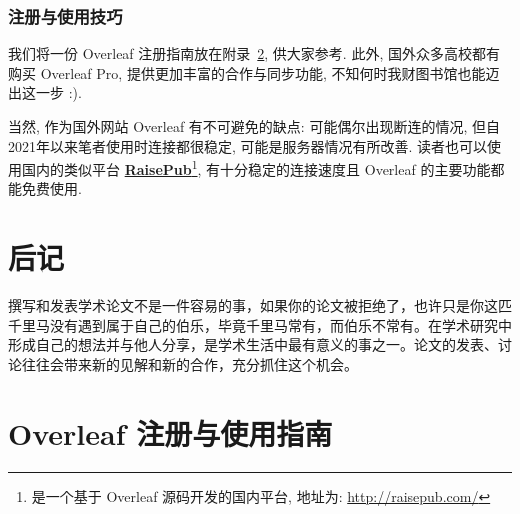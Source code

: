 \documentclass{formatBook}
\begin{document}
\subsection{注册与使用技巧}
我们将一份 Overleaf 注册指南放在附录~\ref{overleafGuide}, 供大家参考. 此外, 国外众多高校都有购买 Overleaf Pro, 提供更加丰富的合作与同步功能, 不知何时我财图书馆也能迈出这一步 :). 

当然, 作为国外网站 Overleaf 有不可避免的缺点: 可能偶尔出现断连的情况, 但自2021年以来笔者使用时连接都很稳定, 可能是服务器情况有所改善. 读者也可以使用国内的类似平台 \textbf{\href{http://raisepub.com/}{RaisePub}}\footnote{是一个基于 Overleaf 源码开发的国内平台, 地址为: \url{http://raisepub.com/}}, 有十分稳定的连接速度且 Overleaf 的主要功能都能免费使用.

\chapter{后记}
撰写和发表学术论文不是一件容易的事，如果你的论文被拒绝了，也许只是你这匹千里马没有遇到属于自己的伯乐，毕竟千里马常有，而伯乐不常有。在学术研究中形成自己的想法并与他人分享，是学术生活中最有意义的事之一。论文的发表、讨论往往会带来新的见解和新的合作，充分抓住这个机会。

\printbibliography
\appendix
\chapter{Overleaf 注册与使用指南}\label{overleafGuide}

\end{document}
